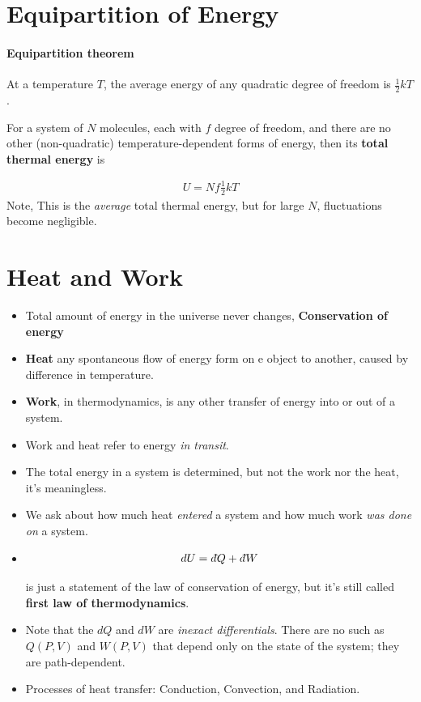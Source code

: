 \documentclass{book}
\newcommand{\dbar}{d\hspace*{-0.08em}\bar{}\hspace*{0.1em}}
\begin{document}
\section{Equipartition of Energy}%
\label{sec:equi of energy}

\paragraph{Equipartition theorem} At a temperature $T$, the average energy of any
quadratic degree of freedom is $\frac{1}{2}kT$.

For a system of $N$ molecules, each with $f$ degree of freedom, and there are no other
(non-quadratic) temperature-dependent forms of energy, then its \textbf{total thermal energy} is

\begin{align}
	U = Nf \frac{1}{2}kT
\end{align}
Note, This is the \textit{average} total thermal energy,
but for large $N$, fluctuations become negligible.


\section{Heat and Work}%
\label{sec:heat and work}

\begin{itemize}
	\item Total amount of energy in the universe never changes, \textbf{Conservation of energy}
	\item \textbf{Heat} any spontaneous flow of energy form on e object to another, caused by
	      difference in temperature.
	\item \textbf{Work}, in thermodynamics, is any other transfer of energy into or out of a system.
	\item Work and heat refer to energy \textit{in transit}.
	\item The total energy in a system is determined, but not the work nor the heat, it's meaningless.
	\item We ask about how much heat \textit{entered} a system and how much work
	      \textit{was done on} a system.
	\item
	      \begin{align}
		      \label{eq:1st law thermo}
		      dU = \dbar Q + \dbar W
	      \end{align}

	      is just a statement of the law of conservation of energy, but it's still called
	      \textbf{first law of thermodynamics}.
	\item Note that the $ dQ $ and $ dW $ are \textit{inexact differentials}. There are no such as
	      $ Q(P, V) $ and $ W(P, V) $ that depend only on the state of the system; they are path-dependent.




	\item Processes of heat transfer: Conduction, Convection, and Radiation.
\end{itemize}
\end{document}

